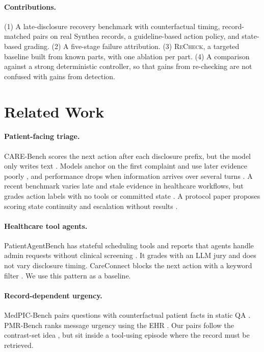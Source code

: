 \documentclass[10pt,twocolumn]{article}
\newcommand{\recheck}{\textsc{ReCheck}}
\begin{document}
\paragraph{Contributions.}
(1) A late-disclosure recovery benchmark with counterfactual timing, record-matched pairs on real Synthea records, a guideline-based action policy, and state-based grading. (2) A five-stage failure attribution. (3) \recheck{}, a targeted baseline built from known parts, with one ablation per part. (4) A comparison against a strong deterministic controller, so that gains from re-checking are not confused with gains from detection.

\section{Related Work}\label{sec:related}
\paragraph{Patient-facing triage.} CARE-Bench scores the next action after each disclosure prefix, but the model only writes text \citep{hua2026carebench}. Models anchor on the first complaint and use later evidence poorly \citep{srirag2026anchor}, and performance drops when information arrives over several turns \citep{laban2025lost}. A recent benchmark varies late and stale evidence in healthcare workflows, but grades action labels with no tools or committed state \citep{zheng2026auditing}. A protocol paper proposes scoring state continuity and escalation without results \citep{yao2026workflow}.

\paragraph{Healthcare tool agents.} PatientAgentBench has stateful scheduling tools and reports that agents handle admin requests without clinical screening \citep{vatanparvar2026patientagentbench}. It grades with an LLM jury and does not vary disclosure timing. CareConnect blocks the next action with a keyword filter \citep{hasan2026careconnect}. We use this pattern as a baseline.

\paragraph{Record-dependent urgency.} MedPIC-Bench pairs questions with counterfactual patient facts in static QA \citep{hou2026medpic}. PMR-Bench ranks message urgency using the EHR \citep{gatto2026pmrbench}. Our pairs follow the contrast-set idea \citep{gardner2020contrast}, but sit inside a tool-using episode where the record must be retrieved.
\end{document}
